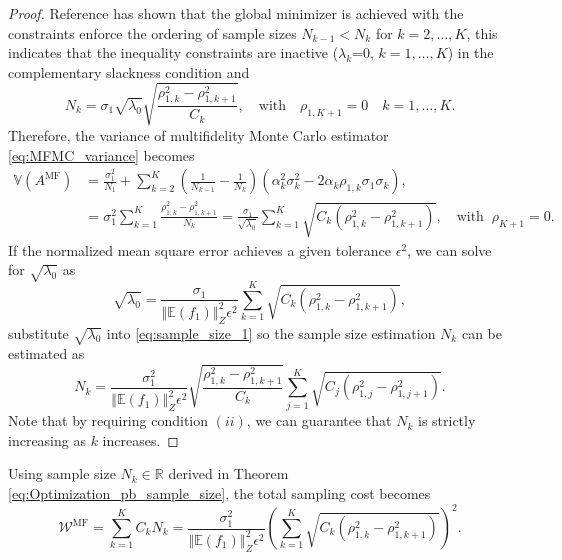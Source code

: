 \documentclass[final,3p,times,11pt]{elsarticle}
\begin{document}
\begin{proof}
 Reference \cite{PeWiGu:2016} has shown that the global minimizer is achieved with the constraints enforce the ordering of sample sizes $N_{k-1}< N_k$ for $k=2,\ldots, K$, 
this indicates that the inequality constraints are inactive ($\lambda_k$=0, $k=1,\dots, K$) in the complementary slackness condition and
\begin{equation}
\label{eq:sample_size_1}
    N_k = \sigma_1\sqrt{\lambda_0}\sqrt{\frac{\rho_{1,k}^2-\rho_{1,k+1}^2}{C_k}},\quad \text{with}\quad  \rho_{1,K+1}=0 \quad k=1,\ldots,K.
\end{equation}
Therefore, the variance of multifidelity Monte Carlo estimator \eqref{eq:MFMC_variance} becomes
\begin{align}
\nonumber
    \mathbb{V}\left(A^{\text{MF}}\right)&=\frac{\sigma_1^2}{N_1} + \sum_{k=2}^K \left(\frac{1}{N_{k-1}} - \frac{1}{N_k}\right)\left(\alpha_k^2\sigma_k^2 - 2\alpha_k\rho_{1,k}\sigma_1\sigma_k\right),\\
    \label{eq:MFMC_variance2}
    &=\sigma_1^2\sum_{k=1}^{K} \frac{\rho_{1,k}^2 - \rho_{1,k+1}^2}{N_k} = \frac{\sigma_1}{\sqrt{\lambda_0}}\sum_{k=1}^K\sqrt{C_k\left(\rho_{1,k}^2-\rho_{1,k+1}^2\right)},\quad \text{with}\;\;\rho_{K+1}=0.
\end{align}
If the normalized mean square error achieves a given tolerance $\epsilon^2$, we can solve for $\sqrt{\lambda_0}$ as
\[
\sqrt{\lambda_0} = \frac{\sigma_1}{\left\Vert\mathbb{E}(f_1) \right\Vert_{Z}^2\epsilon^2}\sum_{k=1}^K\sqrt{C_k\left(\rho_{1,k}^2-\rho_{1,k+1}^2\right)},
\]
substitute $\sqrt{\lambda_0}$ into \eqref{eq:sample_size_1} so the sample size estimation $N_k$ can be estimated as
\[
N_k = \frac{\sigma_1^2}{\left\Vert\mathbb{E}(f_1) \right\Vert_{Z}^2\epsilon^2}\sqrt{\frac{\rho_{1,k}^2-\rho_{1,k+1}^2}{C_k}}\sum_{j=1}^K\sqrt{C_j\left(\rho_{1,j}^2-\rho_{1,j+1}^2\right)}.
\]
Note that by requiring condition $(ii)$, we can guarantee that $N_k$ is strictly increasing as $k$ increases. 
\end{proof}

Using sample size $N_k\in \mathbb{R}$ derived in Theorem \eqref{eq:Optimization_pb_sample_size}, the total sampling cost becomes
\begin{equation}\label{eq:MFMC_sampling_cost}
    \mathcal{W}^\text{MF} = \sum_{k=1}^K C_k N_k = \frac{\sigma_1^2}{\left\Vert\mathbb{E}(f_1) \right\Vert_{Z}^2\epsilon^2}\left(\sum_{k=1}^K\sqrt{C_k\left(\rho_{1,k}^2 - \rho_{1,k+1}^2\right)}\right)^2.
\end{equation}
\end{document}
